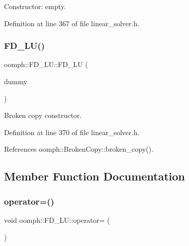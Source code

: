 Constructor\+: empty. 



Definition at line 367 of file linear\+\_\+solver.\+h.

\mbox{\label{classoomph_1_1FD__LU_ad45be3df2a071c29cef9a9555bbd28f8}} 
\subsubsection{\texorpdfstring{F\+D\+\_\+\+L\+U()}{FD\_LU()}\hspace{0.1cm}{\footnotesize\ttfamily [2/2]}}
{\footnotesize\ttfamily oomph\+::\+F\+D\+\_\+\+L\+U\+::\+F\+D\+\_\+\+LU (\begin{DoxyParamCaption}\item[{const \hyperlink{classoomph_1_1FD__LU}{F\+D\+\_\+\+LU} \&}]{dummy }\end{DoxyParamCaption})\hspace{0.3cm}{\ttfamily [inline]}}



Broken copy constructor. 



Definition at line 370 of file linear\+\_\+solver.\+h.



References oomph\+::\+Broken\+Copy\+::broken\+\_\+copy().



\subsection{Member Function Documentation}
\mbox{\label{classoomph_1_1FD__LU_a972f0332d47cf89719ab28f3feeb36d5}} 
\subsubsection{\texorpdfstring{operator=()}{operator=()}}
{\footnotesize\ttfamily void oomph\+::\+F\+D\+\_\+\+L\+U\+::operator= (\begin{DoxyParamCaption}\item[{const \hyperlink{classoomph_1_1FD__LU}{F\+D\+\_\+\+LU} \&}]{ }\end{DoxyParamCaption})\hspace{0.3cm}{\ttfamily [inline]}}



